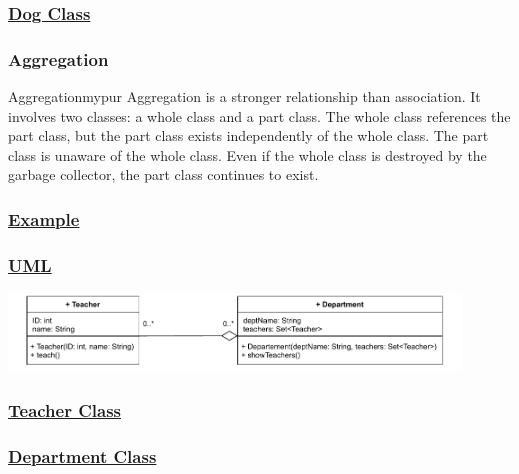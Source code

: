 \subsubsection*{\underline{Dog Class}}


\subsubsection*{Aggregation}

\begin{prettyBox}{Aggregation}{mypur}
Aggregation is a stronger relationship than association. It involves two classes: a whole class and a part class. The whole class references the part class, but the part class exists independently of the whole class. The part class is unaware of the whole class. Even if the whole class is destroyed by the garbage collector, the part class continues to exist.
\end{prettyBox}

\subsubsection*{\underline{Example}}

\subsubsection*{\underline{UML}}

\begin{center}
\includegraphics[width=0.9\textwidth]{Chapters/Diagram/OOP/EX5/ex5.drawio.pdf}
\end{center}


\subsubsection*{\underline{Teacher Class}}


\subsubsection*{\underline{Department Class}}


